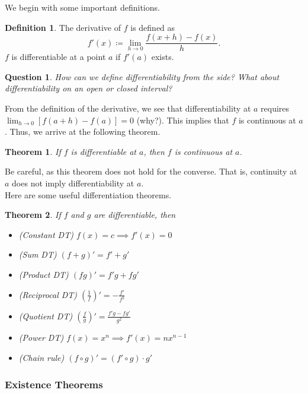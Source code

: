 \documentclass[11pt]{scrartcl}
\theoremstyle{plain}
\newtheorem{theorem}{Theorem}[section]
\newtheorem*{question}{Question}
\theoremstyle{definition}
\newtheorem*{definition}{Definition}
\theoremstyle{remark}
\begin{document}
We begin with some important definitions.

\begin{definition}
    The derivative of $f$ is defined as \[ f'(x)\coloneqq \lim_{ h \to 0 } \frac{{f(x+h)-f(x)}}{h}. \]
    $f$ is differentiable at a point $a$ if $f'(a)$ exists.
\end{definition}

\begin{question} 
    How can we define differentiability from the side? What about differentiability on an open or
    closed interval?
\end{question}

From the definition of the derivative, we see that differentiability at $a$ requires $\lim_{ h \to 0 } 
[f(a+h)-f(a)]=0$ (why?). This implies that $f$ is continuous at $a$. Thus, we arrive at the following theorem.

\begin{theorem}
    If $f$ is differentiable at $a$, then $f$ is continuous at $a$.
\end{theorem}

Be careful, as this theorem does not hold for the converse. That is, continuity at $a$ does not imply
differentiability at $a$. \\[-0.5em]

Here are some useful differentiation theorems.

\begin{theorem}
    If $f$ and $g$ are differentiable, then
    \begin{itemize}
        \item (Constant DT) $f(x)=c\implies f'(x)=0$
        \item (Sum DT) $(f+g)'=f'+g'$
        \item (Product DT) $(fg)'=f'g+fg'$
        \item (Reciprocal DT) $\left( \frac{1}{f} \right)'=-\frac{f'}{f^{2}}$
        \item (Quotient DT) $\left( \frac{f}{g} \right)'= \frac{{f'g-fg'}}{g^{2}}$
        \item (Power DT) $f(x)=x^n\implies f'(x)=nx^{n-1}$
        \item (Chain rule) $(f\circ g)'=(f'\circ g)\cdot g'$
    \end{itemize}
\end{theorem}

\subsubsection{Existence Theorems}
\end{document}
